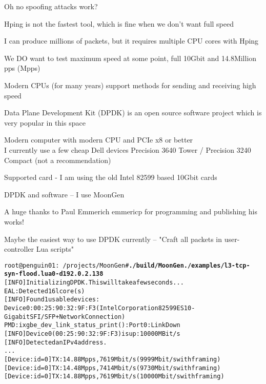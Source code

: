 \documentclass[Screen16to9,17pt]{foils}
\begin{document}
\centerline{Oh no spoofing attacks work?}



\begin{list2}
\item Hping is not the fastest tool, which is fine when we don't want full speed
\item I can produce millions of packets, but it requires multiple CPU cores with Hping
\item We DO want to test maximum speed at some point, full 10Gbit and 14.8Million pps (Mpps)
\item Modern CPUs (for many years) support methods for sending and receiving high speed
\item Data Plane Development Kit (DPDK) is an open source software project which is very popular in this space \\
\end{list2}




\begin{list2}
\item Modern computer with modern CPU and PCIe x8 or better\\
I currently use a few cheap Dell devices Precision 3640 Tower / Precision 3240 Compact (not a recommendation)
\item Supported card - I am using the old Intel 82599 based 10Gbit cards
\item DPDK and software -- I use MoonGen 
\item A huge thanks to Paul Emmerich emmericp for programming and publishing his works!
\item Maybe the easiest way to use DPDK currently -- "Craft all packets in user-controller Lua scripts"
\end{list2}



\begin{alltt}\footnotesize
root@penguin01:~/projects/MoonGen# {\bf ./build/MoonGen ./examples/l3-tcp-syn-flood.lua 0 -d 192.0.2.138}
[INFO]  Initializing DPDK. This will take a few seconds...
EAL: Detected 16 lcore(s)
[INFO]  Found 1 usable devices:
   Device 0: 00:25:90:32:9F:F3 (Intel Corporation 82599ES 10-Gigabit SFI/SFP+ Network Connection)
PMD: ixgbe_dev_link_status_print():  Port 0: Link Down
[INFO]  Device 0 (00:25:90:32:9F:F3) is up: 10000 MBit/s
[INFO]  Detected an IPv4 address.
...
[Device: id=0] TX: 14.88 Mpps, 7619 Mbit/s (9999 Mbit/s with framing)
[Device: id=0] TX: 14.48 Mpps, 7414 Mbit/s (9730 Mbit/s with framing)
[Device: id=0] TX: 14.88 Mpps, 7619 Mbit/s (10000 Mbit/s with framing)
\end{alltt}
\end{document}
